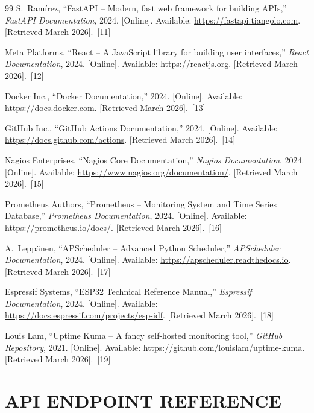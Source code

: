 \documentclass[12pt,a4paper,oneside]{report}
\begin{document}
\begin{thebibliography}{99}
S.~Ram{\'i}rez,
``FastAPI -- Modern, fast web framework for building APIs,''
\textit{FastAPI Documentation}, 2024.
[Online]. Available: \url{https://fastapi.tiangolo.com}.
[Retrieved March 2026].~[11]

Meta Platforms,
``React -- A JavaScript library for building user interfaces,''
\textit{React Documentation}, 2024.
[Online]. Available: \url{https://reactjs.org}.
[Retrieved March 2026].~[12]

Docker Inc.,
``Docker Documentation,''
2024.
[Online]. Available: \url{https://docs.docker.com}.
[Retrieved March 2026].~[13]

GitHub Inc.,
``GitHub Actions Documentation,''
2024.
[Online]. Available: \url{https://docs.github.com/actions}.
[Retrieved March 2026].~[14]

Nagios Enterprises,
``Nagios Core Documentation,''
\textit{Nagios Documentation}, 2024.
[Online]. Available: \url{https://www.nagios.org/documentation/}.
[Retrieved March 2026].~[15]

Prometheus Authors,
``Prometheus -- Monitoring System and Time Series Database,''
\textit{Prometheus Documentation}, 2024.
[Online]. Available: \url{https://prometheus.io/docs/}.
[Retrieved March 2026].~[16]

A.~Lepp\"anen,
``APScheduler -- Advanced Python Scheduler,''
\textit{APScheduler Documentation}, 2024.
[Online]. Available: \url{https://apscheduler.readthedocs.io}.
[Retrieved March 2026].~[17]

Espressif Systems,
``ESP32 Technical Reference Manual,''
\textit{Espressif Documentation}, 2024.
[Online]. Available: \url{https://docs.espressif.com/projects/esp-idf}.
[Retrieved March 2026].~[18]

Louis Lam,
``Uptime Kuma -- A fancy self-hosted monitoring tool,''
\textit{GitHub Repository}, 2021.
[Online]. Available: \url{https://github.com/louislam/uptime-kuma}.
[Retrieved March 2026].~[19]

\end{thebibliography}

\appendix

\chapter{API ENDPOINT REFERENCE}
\label{app:api}
\end{document}
